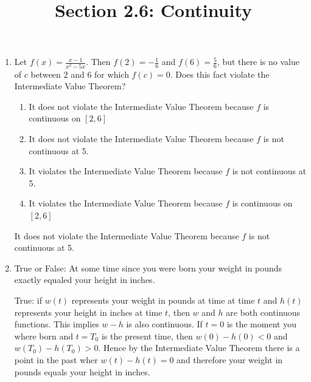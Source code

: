 \documentclass[nooutcomes, handout]{ximera}
\title{Section 2.6: Continuity}
\begin{document}
\begin{abstract}		\end{abstract}
\maketitle

\begin{problem}
	\begin{enumerate}
   	\item  Let $f(x) = \frac{x-1}{x^2 - 5x}$.  Then $f(2)=-\frac{1}{6}$ and $f(6)=\frac{5}{6}$, but there is no value of $c$ between $2$ and $6$ for which $f(c)=0$.  Does this fact violate the Intermediate Value Theorem?
	\begin{enumerate}
	\item It does not violate the Intermediate Value Theorem because $f$ is continuous on $[2,6]$
	\item It does not violate the Intermediate Value Theorem because $f$ is not continuous at 5.
	\item It violates the Intermediate Value Theorem because $f$ is not continuous at 5.
	\item It violates the Intermediate Value Theorem because $f$ is continuous on $[2,6]$

	\end{enumerate}
      \begin{freeResponse}
        It does not violate the Intermediate Value Theorem because $f$ is not continuous at 5.
      \end{freeResponse}

	\item	True or False: At some time since you were born your weight in pounds exactly equaled your height in inches.
      \begin{freeResponse}
        True: if $w(t)$ represents your weight in pounds at time at time $t$ and $h(t)$ represents your height in inches at time $t$, then $w$ and $h$ are both continuous functions.  This implies $w - h$ is also continuous.
        If $t = 0$ is the moment you where born and $t = T_0$ is the present time, then $w(0) - h(0) < 0$ and $w(T_0) - h(T_0) > 0$.
        Hence by the Intermediate Value Theorem there is a point in the past wher $w(t)-h(t)=0$ and therefore your weight in pounds equals your height in inches.
      \end{freeResponse}
	
	\end{enumerate}

\end{problem}
\end{document}
